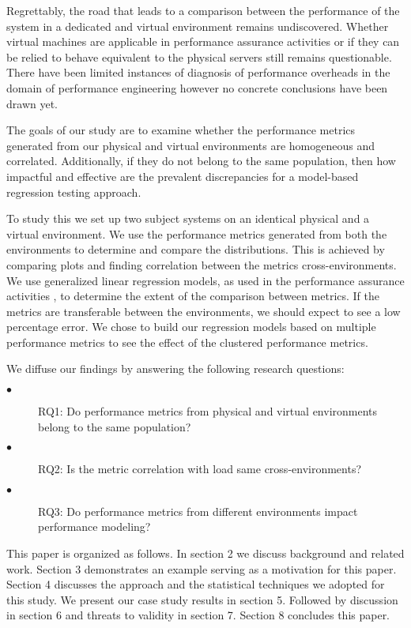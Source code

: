 Regrettably, the road that leads to a comparison between the performance of the system in a dedicated and virtual environment remains undiscovered. Whether virtual machines are applicable in performance assurance activities or if they can be relied to behave equivalent to the physical servers still remains questionable. There have been limited instances of diagnosis of performance overheads \cite{menon2005diagnosing} in the domain of performance engineering however no concrete conclusions have been drawn yet. 

The goals of our study are to examine whether the performance metrics generated from our physical and virtual environments are homogeneous and correlated. 
Additionally, if they do not belong to the same population, then how impactful and effective are the prevalent discrepancies for a model-based regression testing approach.    

To study this we set up two subject systems on an identical physical and a virtual environment. We use the performance metrics generated from both the environments to determine and compare the distributions. This is achieved by comparing plots and finding correlation between the metrics cross-environments. We use generalized linear regression models, as used in the performance assurance activities \cite{Shang:2015:ADP:2668930.2688052}, to determine the extent of the comparison between metrics. If the metrics are transferable between the environments, we should expect to see a low percentage error. We chose to build our regression models based on multiple performance metrics to see the effect of the clustered performance metrics. 

We diffuse our findings by answering the following research questions:

\begin{description}
	\item[$\bullet$] RQ1: Do performance metrics from physical and virtual environments belong to the same population?
	\item[$\bullet$] RQ2: Is the metric correlation with load same cross-environments?
	\item[$\bullet$] RQ3: Do performance metrics from different environments impact performance modeling?

\end{description}

This paper is organized as follows. In section 2 we discuss background and related work. Section 3 demonstrates an example serving as a motivation for this paper. Section 4 discusses the approach and the statistical techniques we adopted for this study. We present our case study results in section 5. Followed by discussion in section 6 and threats to validity in section 7. Section 8 concludes this paper.
